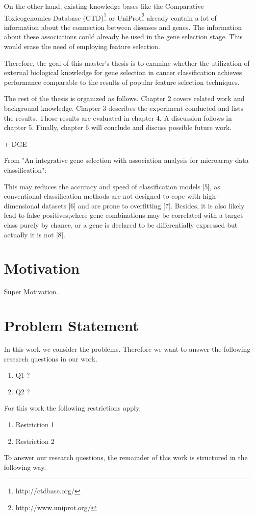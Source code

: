 On the other hand, 	existing knowledge bases like the Comparative Toxicogenomics Database (CTD)\footnote{http://ctdbase.org/} or UniProt\footnote{http://www.uniprot.org/} already contain a lot of information about the connection between diseases and genes. The information about these associations could already be used in the gene selection stage. This would erase the need of employing feature selection.

Therefore, the goal of this master's thesis is to examine whether the utilization of external biological knowledge for gene selection in cancer classification achieves performance comparable to the results of popular feature selection techniques. 

The rest of the thesis is organized as follows. Chapter 2 covers related work and background knowledge. Chapter 3 describes the experiment conducted and lists the results. Those results are evaluated in chapter 4. A discussion follows in chapter 5. Finally, chapter 6 will conclude and discuss possible future work.

+ DGE

From "An integrative gene selection with association analysis for microarray data classification":

This may reduces the accuracy and speed of classification models [5], as conventional classification methods are not designed to cope with high-dimensional datasets [6] and are prone to overfitting [7]. Besides, it is also likely lead to false positives,where gene combinations may be correlated with a target class purely by chance, or a gene is declared to be differentially expressed but actually it is not [8].

\chapter{Motivation}
\label{chapter:Motivation}

Super Motivation.
\chapter{Problem Statement}
\label{chapter:problemStatement}

In this work we consider the problems.
Therefore we want to answer the following research questions in our work.
\begin{enumerate}
\item Q1 ?
\item Q2 ?
\end{enumerate}

For this work the following restrictions apply.
\begin{enumerate}
	\item Restriction 1
	\item Restriction 2
\end{enumerate}

To answer our research questions, the remainder of this work is structured in the following way.